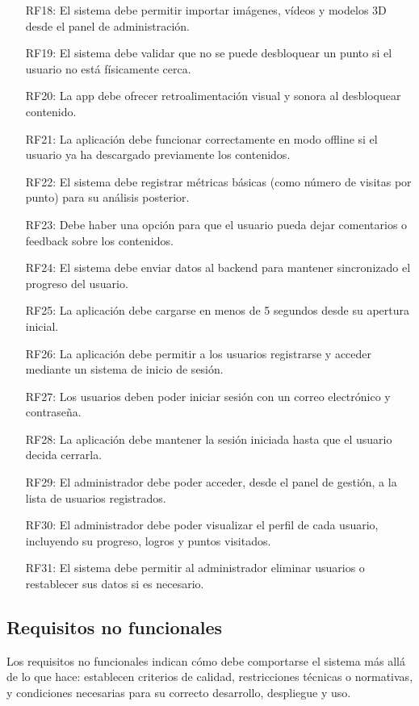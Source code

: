 \begin{itemize}
    \item[RF18:] El sistema debe permitir importar imágenes, vídeos y modelos 3D desde el panel de administración.
    \item[RF19:] El sistema debe validar que no se puede desbloquear un punto si el usuario no está físicamente cerca.
    \item[RF20:] La app debe ofrecer retroalimentación visual y sonora al desbloquear contenido.
    \item[RF21:] La aplicación debe funcionar correctamente en modo offline si el usuario ya ha descargado previamente los contenidos.
    \item[RF22:] El sistema debe registrar métricas básicas (como número de visitas por punto) para su análisis posterior.
    \item[RF23:] Debe haber una opción para que el usuario pueda dejar comentarios o feedback sobre los contenidos.
    \item[RF24:] El sistema debe enviar datos al backend para mantener sincronizado el progreso del usuario.
    \item[RF25:] La aplicación debe cargarse en menos de 5 segundos desde su apertura inicial.
    \item[RF26:] La aplicación debe permitir a los usuarios registrarse y acceder mediante un sistema de inicio de sesión.
    \item[RF27:] Los usuarios deben poder iniciar sesión con un correo electrónico y contraseña.
    \item[RF28:] La aplicación debe mantener la sesión iniciada hasta que el usuario decida cerrarla.
    \item[RF29:] El administrador debe poder acceder, desde el panel de gestión, a la lista de usuarios registrados.
    \item[RF30:] El administrador debe poder visualizar el perfil de cada usuario, incluyendo su progreso, logros y puntos visitados.
    \item[RF31:] El sistema debe permitir al administrador eliminar usuarios o restablecer sus datos si es necesario.
\end{itemize}

\subsection{Requisitos no funcionales}
Los requisitos no funcionales indican cómo debe comportarse el sistema más allá de lo que hace: establecen criterios de calidad, restricciones técnicas o normativas, y condiciones necesarias para su correcto desarrollo, despliegue y uso.

